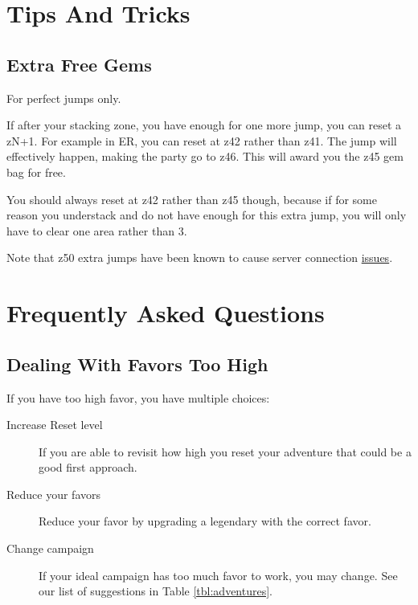 \documentclass{article}
\begin{document}
\section{Tips And Tricks}

\subsection{Extra Free Gems}
\label{sec:extraFreeGems}

For perfect jumps only.

If after your stacking zone, you have enough for one more jump, you can reset a zN+1.
For example in ER, you can reset at z42 rather than z41.
The jump will effectively happen, making the party go to z46.
This will award you the z45 gem bag for free.

You should always reset at z42 rather than z45 though, because if for some reason you understack and do not have enough for this extra jump, you will only have to clear one area rather than 3.

Note that z50 extra jumps have been known to cause server connection \href{https://discord.com/channels/357247482247380994/808221941722906655/1004051568145989733}{issues}.



\section{Frequently Asked Questions}




\subsection{Dealing With Favors Too High}

If you have too high favor, you have multiple choices:
\begin{description}
    \item[Increase Reset level] If you are able to revisit how high you reset your adventure that could be a good first approach.
    \item[Reduce your favors] Reduce your favor by upgrading a legendary with the correct favor.
    \item[Change campaign] If your ideal campaign has too much favor to work, you may change.
    See our list of suggestions in Table \ref{tbl:adventures}.
\end{description}
\end{document}
